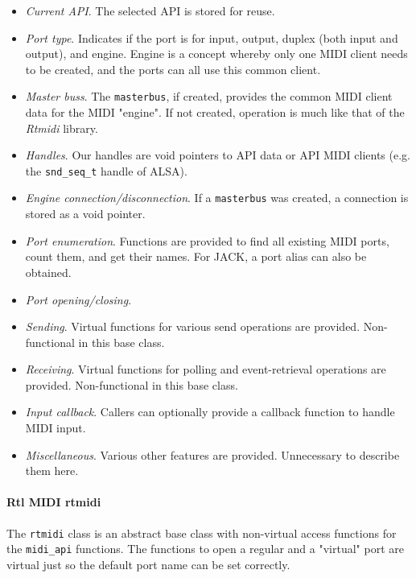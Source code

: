    \begin{itemize}
      \item \textsl{Current API}.
         The selected API is stored for reuse.
      \item \textsl{Port type}.
         Indicates if the port is for input, output,
         duplex (both input and output), and engine.
         Engine is a concept whereby only one MIDI client needs to be
         created, and the ports can all use this common client.
      \item \textsl{Master buss}.
         The \texttt{masterbus}, if created, provides the common MIDI
         client data for the MIDI "engine".
         If not created, operation is much like that of the \textsl{Rtmidi}
         library.
      \item \textsl{Handles}.
         Our handles are void pointers to API data or API MIDI clients (e.g.
         the \texttt{snd\_seq\_t} handle of ALSA).
      \item \textsl{Engine connection/disconnection}.
         If a \texttt{masterbus} was created, a connection is stored as
         a void pointer.
      \item \textsl{Port enumeration}.
         Functions are provided to find all existing MIDI ports, count them,
         and get their names.
         For JACK, a port alias can also be obtained.
      \item \textsl{Port opening/closing}.
      \item \textsl{Sending}.
         Virtual functions for various send operations are provided.
         Non-functional in this base class.
      \item \textsl{Receiving}.
         Virtual functions for polling and event-retrieval
         operations are provided.
         Non-functional in this base class.
      \item \textsl{Input callback}.
         Callers can optionally provide a callback function to handle
         MIDI input.
      \item \textsl{Miscellaneous}.
         Various other features are provided.
         Unnecessary to describe them here.
   \end{itemize}

\paragraph{Rtl MIDI rtmidi}
\label{paragraph:rtl_midi_rtmidi}

   The \texttt{rtmidi} class is an abstract base class with non-virtual access
   functions for the \texttt{midi\_api} functions.
   The functions to open a regular and a "virtual" port are virtual
   just so the default port name can be set correctly.

